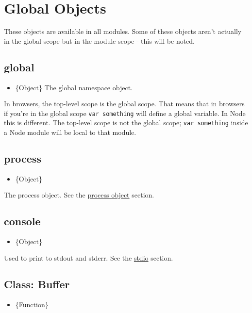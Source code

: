 \section{Global Objects}

These objects are available in all modules. Some of these objects aren't
actually in the global scope but in the module scope - this will be
noted.

\subsection{global}

\begin{itemize}
\item
  \{Object\} The global namespace object.
\end{itemize}

In browsers, the top-level scope is the global scope. That means that in
browsers if you're in the global scope \texttt{var something} will
define a global variable. In Node this is different. The top-level scope
is not the global scope; \texttt{var something} inside a Node module
will be local to that module.

\subsection{process}

\begin{itemize}
\item
  \{Object\}
\end{itemize}

The process object. See the
\href{process.html\#process\_process}{process object} section.

\subsection{console}

\begin{itemize}
\item
  \{Object\}
\end{itemize}

Used to print to stdout and stderr. See the \href{stdio.html}{stdio}
section.

\subsection{Class: Buffer}

\begin{itemize}
\item
  \{Function\}
\end{itemize}


